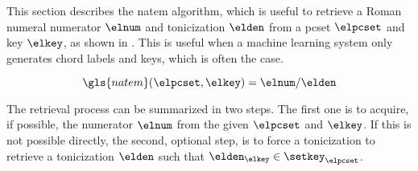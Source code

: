 
This section describes the \gls{natem} algorithm, which is
useful to retrieve a Roman numeral numerator $\elnum$ and
tonicization $\elden$ from a \gls{pcset} $\elpcset$ and key
$\elkey$, as shown in . This is useful when a
machine learning system only generates chord labels and
keys, which is often the case. 

\begin{equation}
    \label{eq:natem}
    \gls{natem}(\elpcset, \elkey) = \elnum\text{/}\elden
\end{equation}

The retrieval process can be summarized in two steps. The
first one is to acquire, if possible, the numerator $\elnum$
from the given $\elpcset$ and $\elkey$. If this is not
possible directly, the second, optional step, is to force a
tonicization to retrieve a tonicization $\elden$ such that
$\elden_\elkey \in \setkey_\elpcset$.

